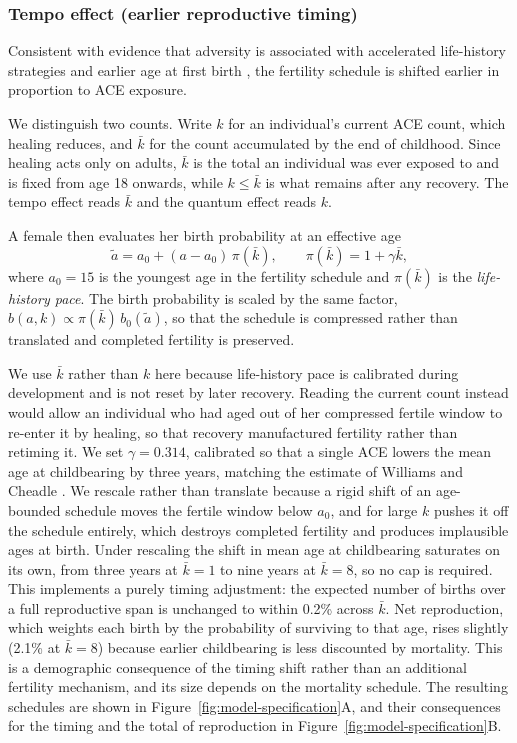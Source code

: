 \documentclass{article}
\begin{document}
\subsubsection*{Tempo effect (earlier reproductive timing)}
Consistent with evidence that adversity is associated with accelerated
life-history strategies and earlier age at first birth
\cite{williams2019adverse}, the fertility schedule is shifted earlier in
proportion to ACE exposure.

We distinguish two counts.  Write \(k\) for an individual's current ACE count,
which healing reduces, and \(\bar{k}\) for the count accumulated by the end of
childhood.  Since healing acts only on adults, \(\bar{k}\) is the total an
individual was ever exposed to and is fixed from age 18 onwards, while
\(k \leq \bar{k}\) is what remains after any recovery.  The tempo effect reads
\(\bar{k}\) and the quantum effect reads \(k\).

A female then evaluates her birth probability at an effective age
\[
    \tilde{a} = a_0 + (a - a_0)\,\pi(\bar{k}),
    \qquad
    \pi(\bar{k}) = 1 + \gamma \bar{k},
\]
where \(a_0 = 15\) is the youngest age in the fertility schedule and
\(\pi(\bar{k})\) is the \emph{life-history pace}.  The birth probability is
scaled by the same factor,
\(b(a,k) \propto \pi(\bar{k})\, b_0(\tilde{a})\), so that the schedule is
compressed rather than translated and completed fertility is preserved.

We use \(\bar{k}\) rather than \(k\) here because life-history pace is
calibrated during development \cite{ellis2009fundamental} and is not reset by
later recovery.  Reading the current count instead would allow an individual
who had aged out of her compressed fertile window to re-enter it by healing,
so that recovery manufactured fertility rather than retiming it.
We set \(\gamma = 0.314\), calibrated so that a single ACE lowers the mean age
at childbearing by three years, matching the estimate of Williams and Cheadle
\cite{williams2019adverse}.
We rescale rather than translate because a rigid shift of an age-bounded
schedule moves the fertile window below \(a_0\), and for large \(k\) pushes it
off the schedule entirely, which destroys completed fertility and produces
implausible ages at birth.  Under rescaling the shift in mean age at
childbearing saturates on its own, from three years at \(\bar{k}=1\) to nine
years at \(\bar{k}=8\), so no cap is required.
This implements a purely timing adjustment: the expected number of births over
a full reproductive span is unchanged to within 0.2\% across \(\bar{k}\).  Net
reproduction, which weights each birth by the probability of surviving to that
age, rises slightly (2.1\% at \(\bar{k}=8\)) because earlier childbearing is
less discounted by mortality.  This is a demographic consequence of the timing
shift rather than an additional fertility mechanism, and its size depends on
the mortality schedule.
The resulting schedules are shown in Figure~\ref{fig:model-specification}A,
and their consequences for the timing and the total of reproduction in
Figure~\ref{fig:model-specification}B.
\end{document}
